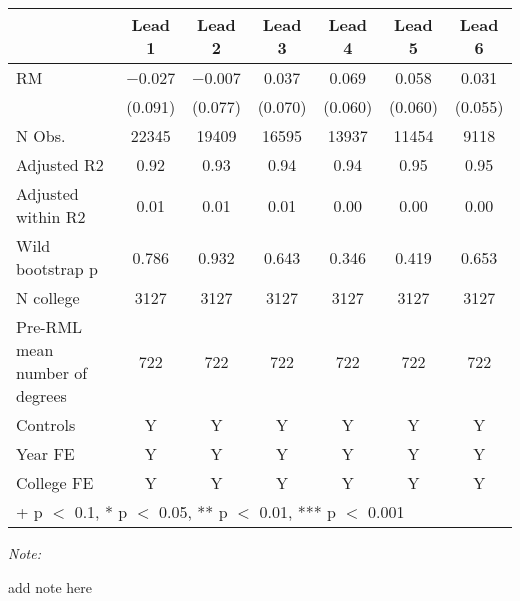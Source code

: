 \begin{table}
\centering
\begin{threeparttable}
\begin{tabular}[t]{lcccccc}
\toprule
  & Lead 1 & Lead 2 & Lead 3 & Lead 4 & Lead 5 & Lead 6\\
\midrule
RM & \num{-0.027} & \num{-0.007} & \num{0.037} & \num{0.069} & \num{0.058} & \num{0.031}\\
 & (\num{0.091}) & (\num{0.077}) & (\num{0.070}) & (\num{0.060}) & (\num{0.060}) & (\num{0.055})\\
\midrule
N Obs. & \num{22345} & \num{19409} & \num{16595} & \num{13937} & \num{11454} & \num{9118}\\
Adjusted R2 & \num{0.92} & \num{0.93} & \num{0.94} & \num{0.94} & \num{0.95} & \num{0.95}\\
Adjusted within R2 & \num{0.01} & \num{0.01} & \num{0.01} & \num{0.00} & \num{0.00} & \num{0.00}\\
Wild bootstrap p & 0.786 & 0.932 & 0.643 & 0.346 & 0.419 & 0.653\\
N college & 3127 & 3127 & 3127 & 3127 & 3127 & 3127\\
Pre-RML mean number of degrees & 722 & 722 & 722 & 722 & 722 & 722\\
Controls & Y & Y & Y & Y & Y & Y\\
Year FE & Y & Y & Y & Y & Y & Y\\
College FE & Y & Y & Y & Y & Y & Y\\
\bottomrule
\multicolumn{7}{l}{\rule{0pt}{1em}+ p $<$ 0.1, * p $<$ 0.05, ** p $<$ 0.01, *** p $<$ 0.001}\\
\end{tabular}
\begin{tablenotes}
\item \textit{Note: } 
\item add note here
\end{tablenotes}
\end{threeparttable}
\end{table}
